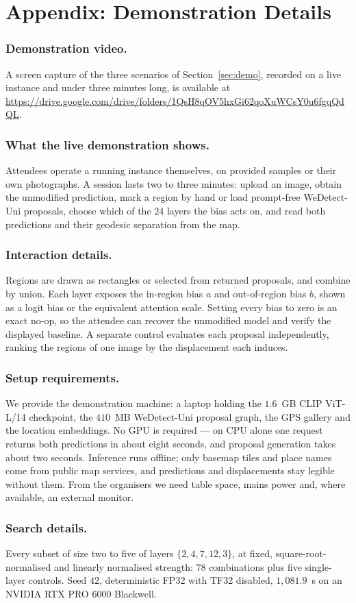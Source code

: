 \section*{Appendix: Demonstration Details}

\subsubsection*{Demonstration video.}
A screen capture of the three scenarios of Section~\ref{sec:demo}, recorded on
a live instance and under three minutes long, is available at
\url{https://drive.google.com/drive/folders/1QsH8qOV5hxGi62qoXuWCsY0u6fgqQdQL}.

\subsubsection*{What the live demonstration shows.}
Attendees operate a running instance themselves, on provided samples or their
own photographs. A session lasts two to three minutes: upload an image, obtain
the unmodified prediction, mark a region by hand or load prompt-free
WeDetect-Uni proposals, choose which of the $24$ layers the bias acts on, and
read both predictions and their geodesic separation from the map.

\subsubsection*{Interaction details.}
Regions are drawn as rectangles or selected from returned proposals, and
combine by union. Each layer exposes the in-region bias $a$ and out-of-region
bias $b$, shown as a logit bias or the equivalent attention scale. Setting
every bias to zero is an exact no-op, so the attendee can recover the
unmodified model and verify the displayed baseline. A separate control
evaluates each proposal independently, ranking the regions of one image by the
displacement each induces.

\subsubsection*{Setup requirements.}
We provide the demonstration machine: a laptop holding the $1.6$~GB CLIP
ViT-L/14 checkpoint, the $410$~MB WeDetect-Uni proposal graph, the GPS gallery
and the location embeddings. No GPU is required --- on CPU alone one request
returns both predictions in about eight seconds, and proposal generation takes
about two seconds. Inference runs offline; only basemap tiles and place names
come from public map services, and predictions and displacements stay legible
without them. From the organisers we need table space, mains power and, where
available, an external monitor.

\subsubsection*{Search details.}
Every subset of size two to five of layers $\{2,4,7,12,3\}$, at fixed,
square-root-normalised and linearly normalised strength: $78$ combinations plus
five single-layer controls. Seed $42$, deterministic FP32 with TF32 disabled,
$1{,}081.9$~s on an NVIDIA RTX PRO 6000 Blackwell.
